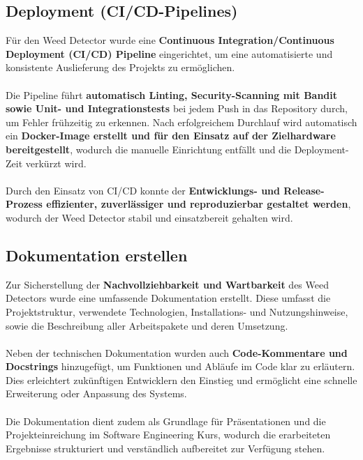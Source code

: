 \documentclass[12pt]{scrartcl}
\begin{document}
\subsection{Deployment (CI/CD-Pipelines)}
Für den Weed Detector wurde eine \textbf{Continuous Integration/Continuous Deployment (CI/CD) Pipeline} eingerichtet, um eine automatisierte und konsistente Auslieferung des Projekts zu ermöglichen.\\
\\
Die Pipeline führt \textbf{automatisch Linting, Security-Scanning mit Bandit sowie Unit- und Integrationstests} bei jedem Push in das Repository durch, um Fehler frühzeitig zu erkennen. Nach erfolgreichem Durchlauf wird automatisch ein \textbf{Docker-Image erstellt und für den Einsatz auf der Zielhardware bereitgestellt}, wodurch die manuelle Einrichtung entfällt und die Deployment-Zeit verkürzt wird.\\
\\
Durch den Einsatz von CI/CD konnte der \textbf{Entwicklungs- und Release-Prozess effizienter, zuverlässiger und reproduzierbar gestaltet werden}, wodurch der Weed Detector stabil und einsatzbereit gehalten wird.

\subsection{Dokumentation erstellen}
Zur Sicherstellung der \textbf{Nachvollziehbarkeit und Wartbarkeit} des Weed Detectors wurde eine umfassende Dokumentation erstellt. Diese umfasst die Projektstruktur, verwendete Technologien, Installations- und Nutzungshinweise, sowie die Beschreibung aller Arbeitspakete und deren Umsetzung.\\
\\
Neben der technischen Dokumentation wurden auch \textbf{Code-Kommentare und Docstrings} hinzugefügt, um Funktionen und Abläufe im Code klar zu erläutern. Dies erleichtert zukünftigen Entwicklern den Einstieg und ermöglicht eine schnelle Erweiterung oder Anpassung des Systems.\\
\\
Die Dokumentation dient zudem als Grundlage für Präsentationen und die Projekteinreichung im Software Engineering Kurs, wodurch die erarbeiteten Ergebnisse strukturiert und verständlich aufbereitet zur Verfügung stehen.
\end{document}
